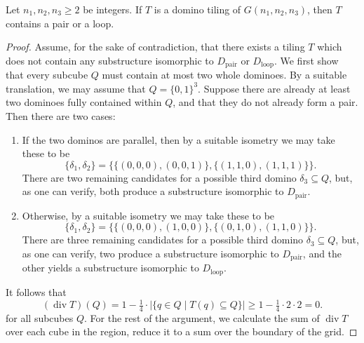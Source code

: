 \begin{theorem}\label{thm:grid}
  Let $n_1, n_2, n_3 \geq 2$ be integers.
  If $T$ is a domino tiling of $G(n_1, n_2, n_3)$, then $T$ contains a pair or a loop.
\end{theorem}
\begin{proof}
  Assume, for the sake of contradiction, that there exists a tiling $T$ which does not contain any substructure isomorphic to $D_{\mathrm{pair}}$ or $D_{\mathrm{loop}}$.
  We first show that every subcube $Q$ must contain at most two whole dominoes.
  By a suitable translation, we may assume that $Q = \{0,1\}^3$. 
  Suppose there are already at least two dominoes fully contained within $Q$, and that they do not already form a pair.
  Then there are two cases:
  \begin{enumerate}
    \item If the two dominos are parallel, then by a suitable isometry we may take these to be
    \begin{equation}
      \{\delta_1, \delta_2\} = \Big\{
        \big\{(0, 0, 0), (0, 0, 1)\big\}, 
        \big\{(1, 1, 0), (1, 1, 1)\big\}
      \Big\}.
    \end{equation}
    There are two remaining candidates for a possible third domino $\delta_3 \subseteq Q$, 
    but, as one can verify, both produce a substructure isomorphic to $D_{\mathrm{pair}}$.
    
    \item Otherwise, by a suitable isometry we may take these to be
    \begin{equation}
      \{\delta_1, \delta_2\} = \Big\{
        \big\{(0, 0, 0), (1, 0, 0)\big\}, 
        \big\{(0, 1, 0), (1, 1, 0)\big\}
      \Big\}.
    \end{equation}
    There are three remaining candidates for a possible third domino $\delta_3 \subseteq Q$, 
    but, as one can verify, two produce a substructure isomorphic to $D_{\mathrm{pair}}$, 
    and the other yields a substructure isomorphic to $D_{\mathrm{loop}}$.
  \end{enumerate}
  It follows that
  \begin{equation}\label{eq:3d-local-div}
    (\operatorname{div} T)(Q) 
    = 1 - \tfrac{1}{4} \cdot \big|\{q \in Q \mid T(q) \subseteq Q \}\big|
    \geq 1 - \tfrac{1}{4} \cdot 2 \cdot 2
    = 0. 
  \end{equation}
  for all subcubes $Q$.
  For the rest of the argument, we calculate the sum of $\operatorname{div} T$ over each cube in the region, reduce it to a sum over the boundary of the grid.


\end{proof}
